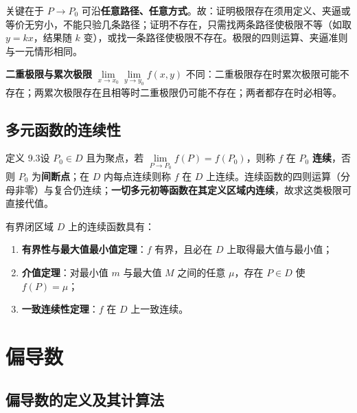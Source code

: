 
关键在于 $P\to P_0$ 可沿\textbf{任意路径、任意方式}。故：证明极限存在须用定义、夹逼或等价无穷小，不能只验几条路径；证明不存在，只需找两条路径使极限不等（如取 $y=kx$，结果随 $k$ 变），或找一条路径使极限不存在。极限的四则运算、夹逼准则与一元情形相同。

\textbf{二重极限与累次极限} $\lim\limits_{x\to x_0}\lim\limits_{y\to y_0}f(x,y)$ 不同：二重极限存在时累次极限可能不存在；两累次极限存在且相等时二重极限仍可能不存在；两者都存在时必相等。


\subsection{多元函数的连续性}

定义 9.3\quad 设 $P_0\in D$ 且为聚点，若 $\lim\limits_{P\to P_0}f(P)=f(P_0)$，则称 $f$ 在 $P_0$ \textbf{连续}，否则 $P_0$ 为\textbf{间断点}；在 $D$ 内每点连续则称 $f$ 在 $D$ 上连续。连续函数的四则运算（分母非零）与复合仍连续；\textbf{一切多元初等函数在其定义区域内连续}，故求这类极限可直接代值。

有界闭区域 $D$ 上的连续函数具有：
\begin{enumerate}
  \item \textbf{有界性与最大值最小值定理}：$f$ 有界，且必在 $D$ 上取得最大值与最小值；
  \item \textbf{介值定理}：对最小值 $m$ 与最大值 $M$ 之间的任意 $\mu$，存在 $P\in D$ 使 $f(P)=\mu$；
  \item \textbf{一致连续性定理}：$f$ 在 $D$ 上一致连续。
\end{enumerate}


\section{偏导数}

\subsection{偏导数的定义及其计算法}

